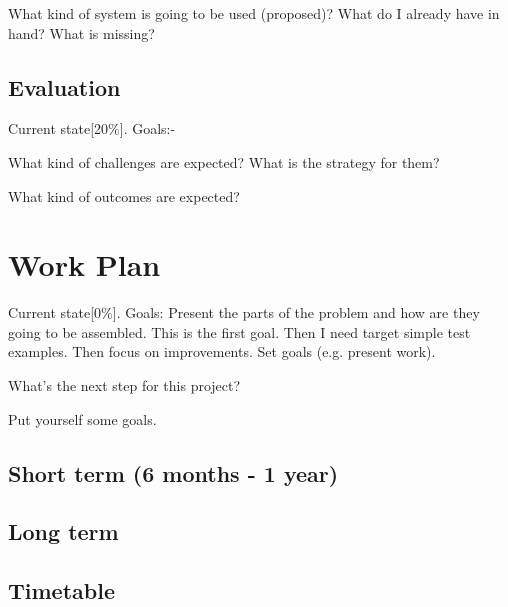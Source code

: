 \documentclass[a4paper, 12pt, openany, oneside]{book}
\begin{document}
What kind of system is going to be used (proposed)?
What do I already have in hand?
What is missing?


\section{Evaluation}
Current state[20\%].
Goals:-

What kind of challenges are expected?
What is the strategy for them?

What kind of outcomes are expected?


\chapter{Work Plan}
Current state[0\%].
Goals: Present the parts of the problem  and how are they going to be assembled. This is the first goal. Then I need target simple test examples. Then focus on improvements. Set goals (e.g. present work).

What's the next step for this project?

Put yourself some goals.

\section{Short term (6 months - 1 year)}
\section{Long term}
\section{Timetable}
\end{document}
